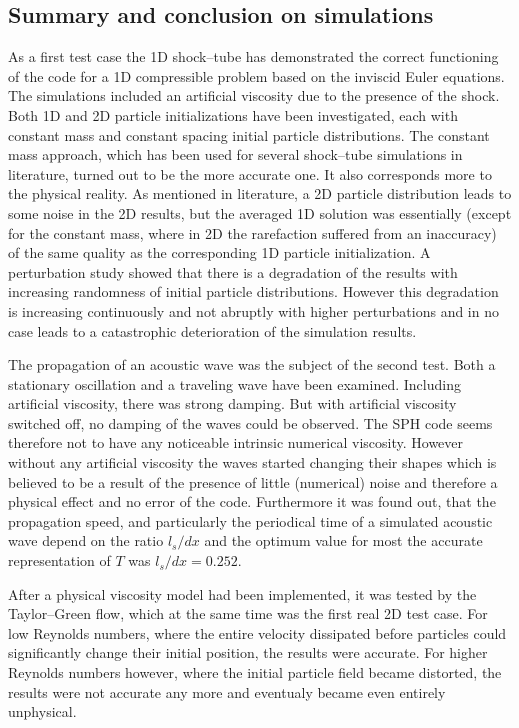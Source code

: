 \documentclass[11pt,a4paper,twoside]{report}
\begin{document}
\subsection{Summary and conclusion on simulations}
As a first test case the 1D shock--tube has demonstrated the correct functioning of the code for a 1D compressible problem based on the inviscid Euler equations. The simulations included an artificial viscosity due to the presence of the shock. Both 1D and 2D particle initializations have been investigated, each with constant mass and constant spacing initial particle distributions. The constant mass approach, which has been used for several shock--tube simulations in literature, turned out to be the more accurate one. It also corresponds more to the physical reality. As mentioned in literature, a 2D particle distribution leads to some noise in the 2D results, but the averaged 1D solution was essentially (except for the constant mass, where in 2D the rarefaction suffered from an inaccuracy) of the same quality as the corresponding 1D particle initialization. A perturbation study showed that there is a degradation of the results with increasing randomness of initial particle distributions. However this degradation is increasing continuously and not abruptly with higher perturbations and in no case leads to a catastrophic deterioration of the simulation results.

The propagation of an acoustic wave was the subject of the second test. Both a stationary oscillation and a traveling wave have been examined. Including artificial viscosity, there was strong damping. But with artificial viscosity switched off, no damping of the waves could be observed. The SPH code seems therefore not to have any noticeable intrinsic numerical viscosity. However without any artificial viscosity the waves started changing their shapes which is believed to be a result of the presence of little (numerical) noise and therefore a physical effect and no error of the code. Furthermore it was found out, that the propagation speed, and particularly the periodical time of a simulated acoustic wave depend on the ratio $l_s/dx$ and the optimum value for most the accurate representation of $T$ was $l_s/dx=0.252$. %

After a physical viscosity model had been implemented, it was tested by the Taylor--Green flow, which at the same time was the first real 2D %
test case. For low Reynolds numbers, where the entire velocity dissipated before particles could significantly change their initial position, the results were accurate. For higher Reynolds numbers however, where the initial particle field became distorted, the results were not accurate any more and eventualy became even entirely unphysical.
\end{document}
